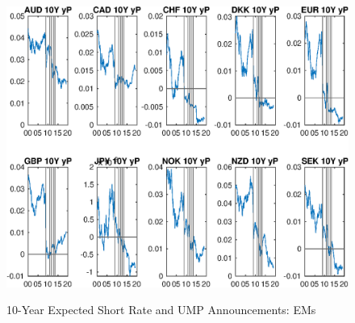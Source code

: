 \documentclass{article}
\begin{document}
\begin{figure}[tbph]
	\begin{center}
		\caption{10-Year Expected Short Rate and UMP Announcements: EMs}
		\label{fig:ny_yP_QE_AE}
		\includegraphics[trim={0cm 0cm 0cm 0cm},clip,height=1\textheight,width=1.4\textwidth]{../Figures/Estimation/ny_yP_QE_AE.eps} \\
	\end{center}
\end{figure}
\end{document}
